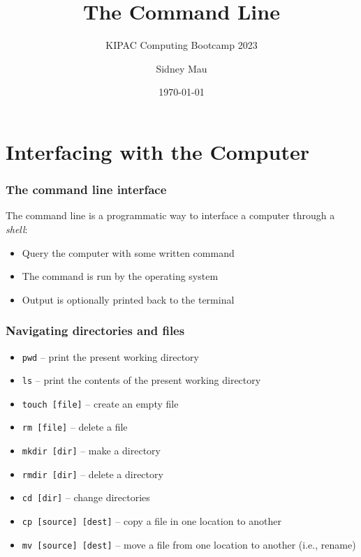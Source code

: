 \documentclass[aspectratio=169]{beamer}
\title{The Command Line}
\subtitle{KIPAC Computing Bootcamp 2023}
\author[S. Mau]{Sidney Mau}
\institute[Stanford]{Stanford University}
\date[\today]{\today}
\begin{document}

\frame{\titlepage}



\section{Interfacing with the Computer}

\frame{\sectionpage}

\begin{frame}
	\frametitle{The command line interface}
	The command line is a programmatic way to interface a computer through a \emph{shell}:
	\begin{itemize}
		\item Query the computer with some written command
		\item The command is run by the operating system
		\item Output is optionally printed back to the terminal
	\end{itemize}
\end{frame}

\begin{frame}
	\frametitle{Navigating directories and files}
	\begin{itemize}
		\item \texttt{pwd} -- print the present working directory
		\item \texttt{ls} -- print the contents of the present working directory
		\item \texttt{touch [file]} -- create an empty file
		\item \texttt{rm [file]} -- delete a file
		\item \texttt{mkdir [dir]} -- make a directory
		\item \texttt{rmdir [dir]} -- delete a directory
		\item \texttt{cd [dir]} -- change directories
		\item \texttt{cp [source] [dest]} -- copy a file in one location to another
		\item \texttt{mv [source] [dest]} -- move a file from one location to another (i.e., rename)
	\end{itemize}
\end{frame}
\end{document}
